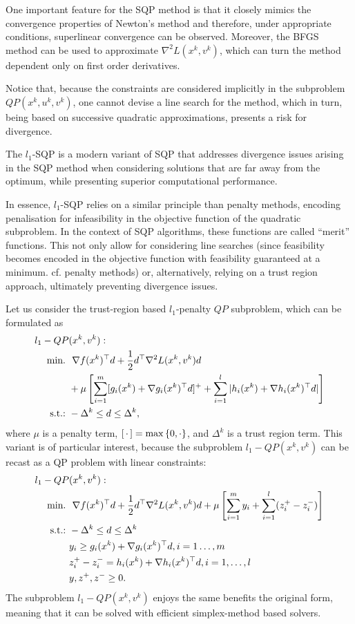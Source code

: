 One important feature for the SQP method is that it closely mimics the convergence properties of Newton's method and therefore, under appropriate conditions, superlinear convergence can be observed. Moreover, the BFGS method can be used to approximate $\nabla^2L(x^k,v^k)$, which can turn the method dependent only on first order derivatives.

Notice that, because the constraints are considered implicitly in the subproblem $QP(x^k, u^k, v^k)$, one cannot devise a line search for the method, which in turn, being based on successive quadratic approximations, presents a risk for divergence.

The $l_1$-SQP is a modern variant of SQP that addresses divergence issues arising in the SQP method when considering solutions that are far away from the optimum, while presenting superior computational performance. 

In essence, $l_1$-SQP relies on a similar principle than penalty methods, encoding penalisation for infeasibility in the objective function of the quadratic subproblem. In the context of SQP algorithms, these functions are called ``merit'' functions. This not only allow for considering line searches (since feasibility becomes encoded in the objective function with feasibility guaranteed at a minimum. cf. penalty methods) or, alternatively, relying on a trust region approach, ultimately preventing divergence issues.

Let us consider the trust-region based $l_1$-penalty $QP$ subproblem, which can be formulated as
%
\begin{align*}
l_1-QP&(x^k, v^k) :\\
\mathop{\text{min.~}} & \ \nabla f(x^k)^\top d + \frac{1}{2}d^\top\nabla^2L(x^k,v^k)d \\ & + \mu\left[ \sum_{i=1}^m [g_i(x^k) + \nabla g_i(x^k)^\top d]^+  + \sum_{i=1}^l |h_i(x^k) + \nabla h_i(x^k)^\top d| \right] \\
 \mathop{\text{s.t.:~}} & -\Delta^k \leq d \leq \Delta^k,  
\end{align*}
where $\mu$ is a penalty term, $[\, \cdot \,] = \max\left\{ 0, \cdot \right \}$, and $\Delta^k$ is a trust region term. This variant is of particular interest, because the subproblem $l_1-QP(x^k, v^k) $ can be recast as a QP problem with linear constraints:
%
\begin{align*}
l_1-QP&(x^k, v^k) :\\
\mathop{\text{min.~}} & \ \nabla f(x^k)^\top d + \frac{1}{2}d^\top\nabla^2L(x^k,v^k)d  + \mu\left[ \sum_{i=1}^m y_i  + \sum_{i=1}^l (z^+_i - z^-_i) \right]\\
 \mathop{\text{s.t.:~}} & -\Delta^k \leq d \leq \Delta^k\\
 & y_i \geq g_i(x^k) + \nabla g_i(x^k)^\top d, i = 1\dots, m\\
 & z^+_i - z^-_i = h_i(x^k) + \nabla h_i(x^k)^\top d, i = 1,\dots,l \\ 
 &y, z^+, z^- \geq 0.   
\end{align*}
%
The subproblem $l_1-QP(x^k, v^k)$ enjoys the same benefits the original form, meaning that it can be solved with efficient simplex-method based solvers. 

